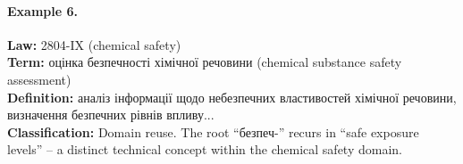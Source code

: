 \documentclass[11pt]{article}
\begin{document}
\paragraph{Example 6.}
\textbf{Law:} 2804-IX (chemical safety) \\
\textbf{Term:} \foreignlanguage{ukrainian}{оцінка безпечності хімічної речовини} (chemical substance safety assessment) \\
\textbf{Definition:} \foreignlanguage{ukrainian}{аналіз інформації щодо небезпечних властивостей хімічної речовини, визначення безпечних рівнів впливу...} \\
\textbf{Classification:} Domain reuse. The root \foreignlanguage{ukrainian}{``безпеч-''} recurs in ``safe exposure levels'' -- a distinct technical concept within the chemical safety domain.
\end{document}
